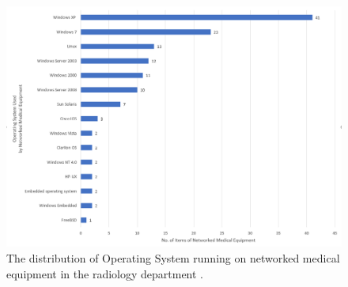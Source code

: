 \documentclass[pdf,bookmarks,colorlinks=true]{IEEEtran}
\begin{document}
\begin{figure}[tp]
	\centering
	\includegraphics[width=0.7\linewidth]{OSonRadiology}
	\caption{The distribution of Operating System running on networked medical equipment in the radiology department \cite{moses2015lack}.}
	\label{fig:osonradiology}
\end{figure}

 
\end{document}

